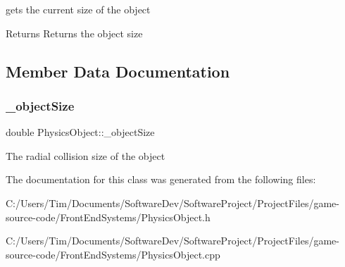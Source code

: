 gets the current size of the object 

\begin{DoxyReturn}{Returns}
Returns the object size 
\end{DoxyReturn}


\subsection{Member Data Documentation}
\mbox{\label{class_physics_object_a417a7eb051cfcfdbf8dfd0cc0875fa0d}} 
\subsubsection{\texorpdfstring{\+\_\+object\+Size}{\_objectSize}}
{\footnotesize\ttfamily double Physics\+Object\+::\+\_\+object\+Size\hspace{0.3cm}{\ttfamily [protected]}}

The radial collision size of the object 

The documentation for this class was generated from the following files\+:\begin{DoxyCompactItemize}
\item 
C\+:/\+Users/\+Tim/\+Documents/\+Software\+Dev/\+Software\+Project/\+Project\+Files/game-\/source-\/code/\+Front\+End\+Systems/Physics\+Object.\+h\item 
C\+:/\+Users/\+Tim/\+Documents/\+Software\+Dev/\+Software\+Project/\+Project\+Files/game-\/source-\/code/\+Front\+End\+Systems/Physics\+Object.\+cpp\end{DoxyCompactItemize}
